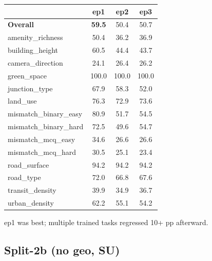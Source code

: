 \documentclass[11pt]{article}
\begin{document}
\begin{table}[h]\centering\scriptsize
\setlength{\tabcolsep}{8pt}
\begin{tabular}{l c c c}
\toprule
& ep1 & ep2 & ep3 \\
\midrule
\textbf{Overall}      & \textbf{59.5} & 50.4 & 50.7 \\
amenity\_richness     & 50.4 & 36.2 & 36.9 \\
building\_height      & 60.5 & 44.4 & 43.7 \\
camera\_direction     & 24.1 & 26.4 & 26.2 \\
green\_space          & 100.0 & 100.0 & 100.0 \\
junction\_type        & 67.9 & 58.3 & 52.0 \\
land\_use             & 76.3 & 72.9 & 73.6 \\
mismatch\_binary\_easy& 80.9 & 51.7 & 54.5 \\
mismatch\_binary\_hard& 72.5 & 49.6 & 54.7 \\
mismatch\_mcq\_easy   & 34.6 & 26.6 & 26.6 \\
mismatch\_mcq\_hard   & 30.5 & 25.1 & 23.4 \\
road\_surface         & 94.2 & 94.2 & 94.2 \\
road\_type            & 72.0 & 66.8 & 67.6 \\
transit\_density      & 39.9 & 34.9 & 36.7 \\
urban\_density        & 62.2 & 55.1 & 54.2 \\
\bottomrule
\end{tabular}
\end{table}

ep1 was best; multiple trained tasks regressed 10+ pp afterward.

\newpage
\subsection*{Split-2b (no geo, SU)}
\end{document}
